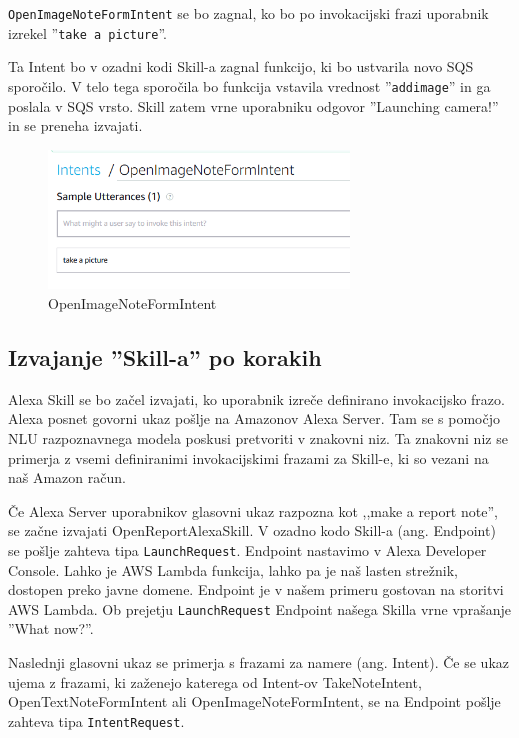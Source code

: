 \documentclass[a4paper, 12pt]{book}
\begin{document}
\texttt{OpenImageNoteFormIntent} se bo zagnal, ko bo po invokacijski frazi uporabnik izrekel ''\texttt{take a picture}''.

Ta Intent bo v ozadni kodi Skill-a zagnal funkcijo, ki bo ustvarila novo SQS sporočilo.
V telo tega sporočila bo funkcija vstavila vrednost ''\texttt{addimage}'' in ga poslala v SQS vrsto.
Skill zatem vrne uporabniku odgovor ''Launching camera!'' in se preneha izvajati.

\begin{figure}[H]
\begin{center}
\includegraphics[width=8cm]{intent_image}
\end{center}
\caption{OpenImageNoteFormIntent}
\label{OpenImageNoteFormIntent}
\end{figure}

\subsection{Izvajanje ''Skill-a'' po korakih}

Alexa Skill se bo začel izvajati, ko uporabnik izreče definirano invokacijsko frazo.
Alexa posnet govorni ukaz pošlje na Amazonov Alexa Server.
Tam se s pomočjo NLU razpoznavnega modela poskusi pretvoriti v znakovni niz.
Ta znakovni niz se primerja z vsemi definiranimi invokacijskimi frazami za Skill-e, ki so vezani na naš Amazon račun.

Če Alexa Server uporabnikov glasovni ukaz razpozna kot ,,make a report note'', se začne izvajati OpenReportAlexaSkill.
V ozadno kodo Skill-a (ang. Endpoint) se pošlje zahteva tipa \texttt{LaunchRequest}.
Endpoint nastavimo v Alexa Developer Console.
Lahko je AWS Lambda funkcija, lahko pa je naš lasten strežnik, dostopen preko javne domene.
Endpoint je v našem primeru gostovan na storitvi AWS Lambda.
Ob prejetju \texttt{LaunchRequest} Endpoint našega Skilla vrne vprašanje ''What now?''.


Naslednji glasovni ukaz se primerja s frazami za namere (ang. Intent).
Če se ukaz ujema z frazami, ki zaženejo katerega od Intent-ov TakeNoteIntent, OpenTextNoteFormIntent ali OpenImageNoteFormIntent, se na Endpoint pošlje zahteva tipa \texttt{IntentRequest}.
\end{document}
